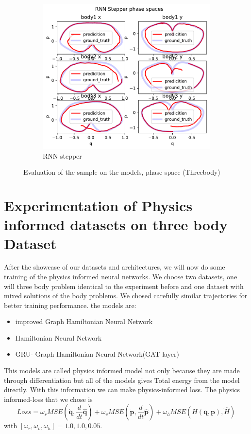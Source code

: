 \begin{figure}[H]
	\hfill
	\begin{subfigure}[b]{0.3\textwidth}
		\centering
		\includegraphics[width=\textwidth]{chapters/chapter5/body3_rne_ps.pdf}
		\caption{RNN stepper}
	\end{subfigure}
	
	\caption{Evaluation of the sample on the models, phase space (Threebody)}
	\label{body3_ps}
\end{figure} 




\section{Experimentation of Physics informed datasets on three body Dataset}
After the showcase of our datasets and architectures, we will now do some training of the physics informed neural networks. We choose two datasets, one will three body problem identical to the experiment before and one dataset with mixed solutions of the body problems. We chosed carefully similar trajectories for better training performance. 
the models are:
\begin{itemize}
	\item improved Graph Hamiltonian Neural Network
	\item Hamiltonian Neural Network
	\item GRU- Graph Hamiltonian Neural Network(GAT layer)
\end{itemize}
This models are called physics informed model not only because they are made through differentiation but all of the models gives Total energy from the model directly. With this information we can make physics-informed loss. 
The physics informed-loss that we chose is
\begin{equation}
	Loss =  \omega_rMSE(\dot{\mathbf{q}},\frac{d}{dt}\hat{\mathbf{q}}) + \omega_v MSE(\dot{\mathbf{p}},\frac{d}{dt}\hat{\mathbf{p}}) +
	\omega_h MSE(H(\mathbf{q},\mathbf{p}),\hat{H}) 
\end{equation} with $[\omega_r,\omega_v,\omega_h] =1.0,1.0,0.05$.


